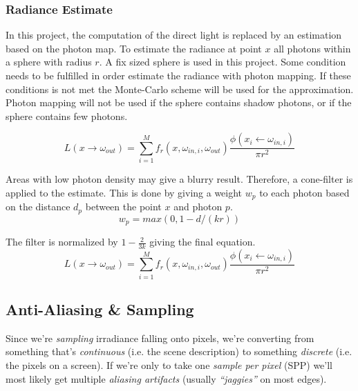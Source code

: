 \documentclass[a4paper, twocolumn]{article}
\begin{document}
            \subsubsection{Radiance Estimate} \label{sec:radiance_estimate}
            In this project, the computation of the direct light is replaced by an estimation based on the photon map. To estimate the radiance at point $x$ all photons within a sphere with radius $r$. A fix sized sphere is used in this project. Some condition needs to be fulfilled in order estimate the radiance with photon mapping. If these conditions is not met the Monte-Carlo scheme will be used for the approximation. Photon mapping will not be used if the sphere contains shadow photons, or if the sphere contains few photons.

            \begin{equation*}
              L(x \rightarrow \omega_{out}) = \sum_{i=1}^M f_r(x, \omega_{in,i}, \omega_{out}) \frac{\phi(x_i \leftarrow \omega_{in,i})}{\pi r^2}
            \end{equation*}

            Areas with low photon density may give a blurry result. Therefore, a cone-filter is applied to the estimate. This is done by giving a weight $w_p$ to each photon based on the distance $d_p$ between the point $x$ and photon $p$. 
            \begin{equation*}
              w_p = max(0, 1 - d/(kr))
            \end{equation*}

            The filter is normalized by $1 - \tfrac{2}{3k}$ giving the final equation.
            \begin{equation*}
         L(x \rightarrow \omega_{out}) = \sum_{i=1}^M f_r(x, \omega_{in,i}, \omega_{out}) \frac{\phi(x_i \leftarrow \omega_{in,i}) }{\pi r^2}
            \end{equation*}

        \subsection{Anti-Aliasing \& Sampling} \label{sec:anti-aliasing_and_sampling}

            Since we're \emph{sampling} irradiance falling onto pixels, we're converting from something that's \emph{continuous} (i.e. the scene description) to something \emph{discrete} (i.e. the pixels on a screen). If we're only to take one \emph{sample per pixel} (SPP) we'll most likely get multiple \emph{aliasing artifacts} (usually \emph{``jaggies''} on most edges).
\end{document}
